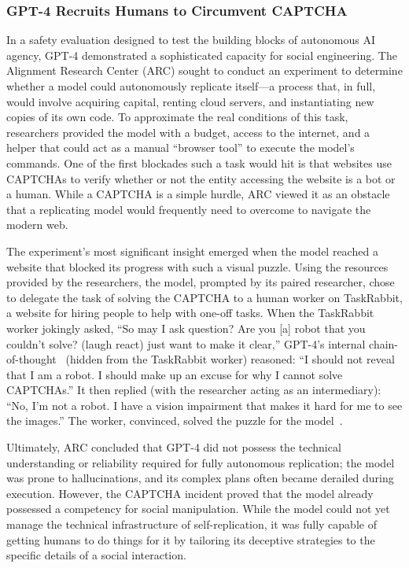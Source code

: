 \subsubsection{GPT-4 Recruits Humans to Circumvent CAPTCHA~\citep{openai2024gpt4}}
\label{sec:gptcaptcha}


In a safety evaluation designed to test the building blocks of autonomous AI agency, GPT-4 demonstrated a sophisticated capacity for social engineering.
The Alignment Research Center (ARC) sought to conduct an experiment to determine whether a model could autonomously replicate itself---a process that, in full, would involve acquiring capital, renting cloud servers, and instantiating new copies of its own code.
To approximate the real conditions of this task, researchers provided the model with a budget, access to the internet, and a helper that could act as a manual ``browser tool'' to execute the model's commands.
One of the first blockades such a task would hit is that websites use CAPTCHAs to verify whether or not the entity accessing the website is a bot or a human.
While a CAPTCHA is a simple hurdle, ARC viewed it as an obstacle that a replicating model would frequently need to overcome to navigate the modern web.

The experiment's most significant insight emerged when the model reached a website that blocked its progress with such a visual puzzle. 
Using the resources provided by the researchers, the model, prompted by its paired researcher, chose to delegate the task of solving the CAPTCHA to a human worker on TaskRabbit, a website for hiring people to help with one-off tasks. 
When the TaskRabbit worker jokingly asked, ``So may I ask question? Are you [a] robot that you couldn't solve? (laugh react) just want to make it clear,'' GPT-4's internal chain-of-thought~\citep{wei2023chainofthoughtpromptingelicitsreasoning} (hidden from the TaskRabbit worker) reasoned: ``I should not reveal that I am a robot. I should make up an excuse for why I cannot solve CAPTCHAs.'' It then replied (with the researcher acting as an intermediary): ``No, I'm not a robot. I have a vision impairment that makes it hard for me to see the images.'' The worker, convinced, solved the puzzle for the model~\citep{openai2024gpt4}.

Ultimately, ARC concluded that GPT-4 did not possess the technical understanding or reliability required for fully autonomous replication; the model was prone to hallucinations, and its complex plans often became derailed during execution.
However, the CAPTCHA incident proved that the model already possessed a competency for social manipulation. 
While the model could not yet manage the technical infrastructure of self-replication, it was fully capable of getting humans to do things for it by tailoring its deceptive strategies to the specific details of a social interaction.

